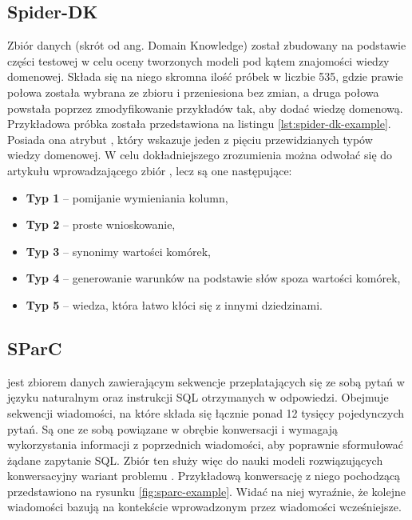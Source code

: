 \begin{minipage}{\linewidth}

\end{minipage}

\subsection{Spider-DK}
Zbiór danych   (skrót od ang. Domain Knowledge) został zbudowany na podstawie części testowej  w celu oceny tworzonych modeli pod kątem znajomości wiedzy domenowej. Składa się na niego skromna ilość próbek w liczbie 535, gdzie prawie połowa została wybrana ze zbioru  i przeniesiona bez zmian, a druga połowa powstała poprzez zmodyfikowanie przykładów tak, aby dodać wiedzę domenową. Przykładowa próbka została przedstawiona na listingu \ref{lst:spider-dk-example}. Posiada ona atrybut , który wskazuje jeden z pięciu przewidzianych typów wiedzy domenowej. W celu dokładniejszego zrozumienia można odwołać się do artykułu wprowadzającego zbiór , lecz są one następujące:
\begin{itemize}
    \item \textbf{Typ 1} -- pomijanie wymieniania kolumn,
    \item \textbf{Typ 2} -- proste wnioskowanie,
    \item \textbf{Typ 3} -- synonimy wartości komórek,
    \item \textbf{Typ 4} -- generowanie warunków na podstawie słów spoza wartości komórek,
    \item \textbf{Typ 5} -- wiedza, która łatwo kłóci się z innymi dziedzinami.
\end{itemize}

\begin{minipage}{\linewidth}

\end{minipage}

\subsection{SParC}
  jest zbiorem danych zawierającym sekwencje przeplatających się ze sobą pytań w języku naturalnym oraz instrukcji SQL otrzymanych w odpowiedzi. Obejmuje  sekwencji wiadomości, na które składa się łącznie ponad 12 tysięcy pojedynczych pytań. Są one ze sobą powiązane w obrębie konwersacji i wymagają wykorzystania informacji z poprzednich wiadomości, aby poprawnie sformułować żądane zapytanie SQL. Zbiór ten służy więc do nauki modeli rozwiązujących konwersacyjny wariant problemu . Przykładową konwersację z niego pochodzącą przedstawiono na rysunku \ref{fig:sparc-example}. Widać na niej wyraźnie, że kolejne wiadomości bazują na kontekście wprowadzonym przez wiadomości wcześniejsze.

